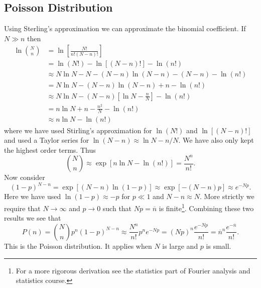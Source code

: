 \documentclass[a4paper]{article}
\newcommand{\mean}[1]{\overline{#1}}
\begin{document}
    \subsection{Poisson Distribution}
    Using Sterling's approximation we can approximate the binomial coefficient.
    If \(N \gg n\) then
    \begin{align*}
        \ln {N \choose n} &= \ln\left[ \frac{N!}{n!(N - n)!} \right]\\
        &= \ln(N!) - \ln[(N - n)!] - \ln(n!)\\
        &\approx N\ln N - N - (N - n)\ln(N - n) - (N - n) - \ln(n!)\\
        &= N\ln N - (N - n)\ln(N - n) + n - \ln(n!)\\
        &\approx N\ln N - (N - n)\left[\ln N - \frac{n}{N}\right] - \ln(n!)\\
        &= n\ln N + n - \frac{n^2}{N} - \ln(n!)\\
        &\approx n\ln N - \ln(n!)
    \end{align*}
    where we have used Stirling's approximation for \(\ln(N!)\) and \(\ln[(N - n)!]\) and used a Taylor series for \(\ln(N - n) \approx \ln N - n/N\).
    We have also only kept the highest order terms.
    Thus
    \[{N \choose n} \approx \exp[n\ln N - \ln(n!)] = \frac{N^n}{n!}.\]
    Now consider
    \[(1 - p)^{N-n} = \exp[(N - n)\ln(1 - p)] \approx \exp[-(N - n)p] \approx e^{-Np}.\]
    Here we have used \(\ln(1 - p) \approx -p\) for \(p \ll 1\) and \(N - n \approx N\).
    More strictly we require that \(N\to\infty\) and \(p\to 0\) such that \(Np = \mean{n}\) is finite\footnote{For a more rigorous derivation see the statistics part of Fourier analysis and statistics course.}.
    Combining these two results we see that
    \[P(n) = {N \choose n}p^n(1 - p)^{N - n} \approx \frac{N^n}{n!}p^ne^{-Np} = (Np)^n\frac{e^{-Np}}{n!} = \mean{n}^n\frac{e^{-\mean{n}}}{n!}.\]
    This is the Poisson distribution.
    It applies when \(N\) is large and \(p\) is small.
    
\end{document}
